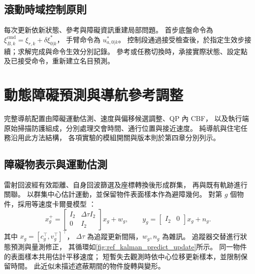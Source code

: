 \subsection{滾動時域控制原則}
\label{subsec:wholebody_receding_horizon}

每次更新依新狀態、參考與障礙資訊重建局部問題。
首步底盤命令為 $\xi_{B,k}^{\mathrm{cmd}}=\xi_{r,k}+\delta\xi_{0|k}^{*}$，
手臂命令為 $u_{a,0|k}^{*}$。
控制段通過接受檢查後，於指定生效步接續；求解完成與命令生效分別記錄。
參考或任務切換時，承接實際狀態、設定點及已接受命令，重新建立名目預測。

\section{動態障礙預測與導航參考調整}
\label{sec:dynamic_obstacle_avoidance}

完整導航配置由障礙運動估測、速度與偏移候選調整、QP 內 CBF，
以及執行端原始掃描防護組成，分別處理交會時間、通行位置與接近速度。
純導航與住宅任務沿用此方法結構，
各項實驗的模組開關與版本則於第四章分別列示。

\subsection{障礙物表示與運動估測}
\label{subsec:obstacle_representation_prediction}

雷射回波經有效距離、自身回波篩選及座標轉換後形成群集，
再與既有軌跡進行關聯。
以群集中心估計運動，並保留物件表面樣本作為避障幾何。
對第 $g$ 個物件，採用等速度卡爾曼模型
\cite{kalman1960filter}：
\begin{equation}
    x_g^+=
    \begin{bmatrix}I_2&\Delta\tau I_2\\0&I_2\end{bmatrix}x_g+w_g,
    \qquad
    y_g=\begin{bmatrix}I_2&0\end{bmatrix}x_g+n_g .
    \label{eq:ch3_obstacle_tracking_model}
\end{equation}
其中 $x_g=[c_g^\top,v_g^\top]^\top$，
$\Delta\tau$ 為追蹤更新間隔，$w_g,n_g$ 為雜訊。
追蹤器交替進行狀態預測與量測修正\cite{welch2004kalman}，
其循環如\cref{fig:ref_kalman_predict_update}所示。
同一物件的表面樣本共用估計平移速度；
短暫失去觀測時依中心位移更新樣本，並限制保留時間。
此近似未描述遮蔽期間的物件旋轉與變形。

